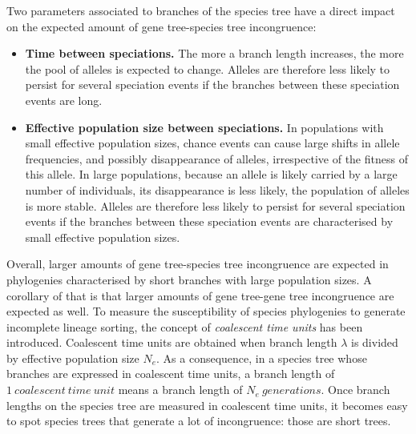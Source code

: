 \documentclass[11pt]{article}
\begin{document}
Two parameters associated to branches of the species tree have a direct impact on the expected amount of gene tree-species tree incongruence:
\begin{itemize}
\item \textbf{Time between speciations.} The more a branch length increases, the more the pool of alleles is expected to change.
Alleles are therefore less likely to persist for several speciation events if the branches between these speciation events are long.
\item \textbf{Effective population size between speciations.} In populations with small effective population sizes, chance events can cause large shifts in allele frequencies, and possibly disappearance of alleles, irrespective of the fitness of this allele. 
In large populations, because an allele is likely carried by a large number of individuals, its disappearance is less likely, the population of alleles is more stable.
Alleles are therefore less likely to persist for several speciation events if the branches between these speciation events are characterised by small effective population sizes.
\end{itemize}
Overall, larger amounts of gene tree-species tree incongruence are expected in phylogenies characterised by short branches with large population sizes. 
A corollary of that is that larger amounts of gene tree-gene tree incongruence are expected as well. 
To measure the susceptibility of species phylogenies to generate incomplete lineage sorting, the concept of \emph{coalescent time units} has been introduced.
Coalescent time units are obtained when branch length $\lambda$ is divided by effective population size $N_e$.
As a consequence, in a species tree whose branches are expressed in coalescent time units, a branch length of $1~coalescent~time~unit $ means a branch length of $N_e~generations$. 
Once branch lengths on the species tree are measured in coalescent time units, it becomes easy to spot species trees that generate a lot of incongruence: those are short trees.
\end{document}
